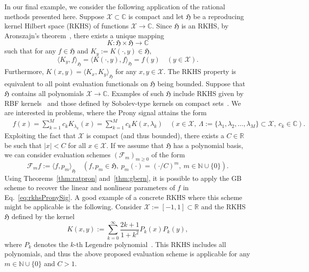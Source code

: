 \documentclass{arxiv}
\newcommand{\C}{\mathbb{C}}
\begin{document}
In our final example, we consider the following application of the rational methods presented here. Suppose $\mathcal{X} \subset \mathbb{C}$ is compact and let $\mathfrak{H}$ be a reproducing kernel Hilbert space (RKHS) of functions $\mathcal{X} \to \mathbb{C}$. Since $\mathfrak{H}$ is an RKHS, by Aronszajn's theorem~\cite{aronszajn1950}, there exists a unique mapping
$$
    K : \mathfrak{H} \times \mathfrak{H} \to \mathbb{C}
$$
such that for any $f \in \mathfrak{H}$ and $K_y := K(\cdot,y) \in \mathfrak{H}$,
$$
    {\langle K_y, f \rangle}_{\mathfrak{H}} = {\langle K( \cdot, y), f \rangle}_{\mathfrak{H}} = f(y) \quad (y \in \mathcal{X}).
$$
Furthermore, $K(x, y) = {\langle K_x, K_y \rangle}_{\mathfrak{H}}$ for any $x,y \in \mathcal{X}$. The RKHS property is equivalent to all point evaluation functionals on $\mathfrak{H}$ being bounded. Suppose that $\mathfrak{H}$ contains all polynomials $\mathcal{X} \to \C$. Examples of such $\mathfrak{H}$ include RKHS given by RBF kernels~\cite{jayasumana2015kernel} and those defined by Sobolev-type kernels on compact sets~\cite{narcowich2002approximation}. We are interested in problems, where the Prony signal attains the form
\begin{equation}
    \label{eq:rkhsPronySig}
    \begin{split}
        & f(x) = \sum_{k=1}^{M} c_k K_{\lambda_k}(x) = \sum_{k=1}^{M} c_k K(x, \lambda_k) \quad (x \in \mathcal{X}, \ \Lambda := \{ \lambda_1, \lambda_2, \ldots, \lambda_M \} \subset \mathcal{X},\  c_k \in \mathbb{C}). 
    \end{split}
\end{equation}
Exploiting the fact that $\mathcal{X}$ is compact (and thus bounded), there exists a $C\in \mathbb{R}$ be such that $|x| < C$ for all $x \in \mathcal{X}$. If we assume that $\mathfrak{H}$ has a polynomial basis, we can  consider evaluation schemes ${(\mathcal{F}_m)}_{m \ge 0}$ of the form
\begin{equation}
    \label{eq:rkhseval}
    \mathcal{F}_m f := {\langle f, p_m \rangle}_{\mathfrak{H}} \quad (f,p_m \in \mathfrak{H},\ p_m(\cdot) = (\cdot /C)^m,\ m \in \mathbb{N} \cup \{0\}). 
\end{equation}
Using Theorems~\ref{thm:ratpron} and~\ref{thm:gbern}, it is possible to apply the GB scheme to recover the linear and nonlinear parameters of $f$ in Eq.~\eqref{eq:rkhsPronySig}. A good example of a concrete RKHS where this scheme might be applicable is the following. Consider $\mathcal{X} := [-1, 1] \subset \mathbb{R}$ and the RKHS $\mathfrak{H}$ defined by the kernel
\begin{equation}
    \label{eq:kergood}
    K(x,y) := \sum_{k=0}^{\infty} \frac{2k +1}{1 + k^2} P_k(x) P_k(y),
\end{equation}
where $P_k$ denotes the $k$-th Legendre polynomial~\cite{szego}. This RKHS includes all polynomials, and thus the above proposed evaluation scheme is applicable for any $m \in \mathbb{N} \cup \{0\}$ and $C > 1$. 
\end{document}
